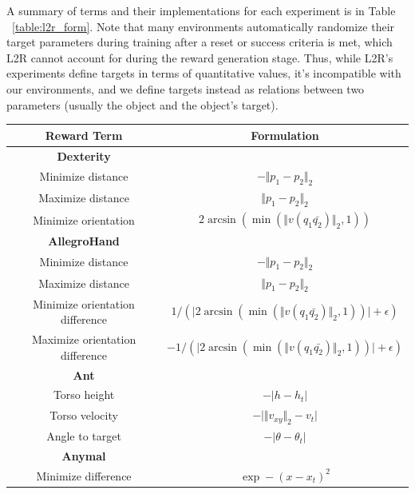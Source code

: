 A summary of terms and their implementations for each experiment is in Table ~\ref{table:l2r_form}. Note that many environments automatically randomize their target parameters during training after a reset or success criteria is met, which L2R cannot account for during the reward generation stage. Thus, while L2R's experiments define targets in terms of quantitative values, it's incompatible with our environments, and we define targets instead as relations between two parameters (usually the object and the object's target). 

\begin{table}[h] %
	\begin{center}
		\begin{tabular}{cc}
			\toprule
                \textbf{Reward Term} & \textbf{Formulation} \\
                \hline
                \textbf{Dexterity} & \\
                Minimize distance & $-\Vert p_1 - p_2 \Vert_2$ \\
                Maximize distance & $\Vert p_1 - p_2 \Vert_2$ \\
                Minimize orientation & $2\arcsin(\min(\Vert v(q_1\bar{q_2}) \Vert_2, 1))$ \\
                \hline
                \textbf{AllegroHand} & \\
                Minimize distance & $-\Vert p_1 - p_2 \Vert_2$ \\
                Maximize distance & $\Vert p_1 - p_2 \Vert_2$ \\
                Minimize orientation difference & $1/(\vert2\arcsin(\min(\Vert v(q_1\bar{q_2}) \Vert_2, 1))\vert+\epsilon)$ \\
                Maximize orientation difference & $-1/(\vert2\arcsin(\min(\Vert v(q_1\bar{q_2}) \Vert_2, 1))\vert+\epsilon)$ \\
                \hline
                \textbf{Ant} & \\
                Torso height & $-\vert h - h_t \vert$ \\
                Torso velocity & $-\vert \Vert v_{xy} \Vert_2 - v_t \vert$ \\
                Angle to target & $-\vert \theta - \theta_t \vert$ \\
                \hline
                \textbf{Anymal} & \\
                Minimize difference & $\exp -(x - x_t)^2$ \\
                \hline

\end{tabular}
\end{center}
\end{table}
